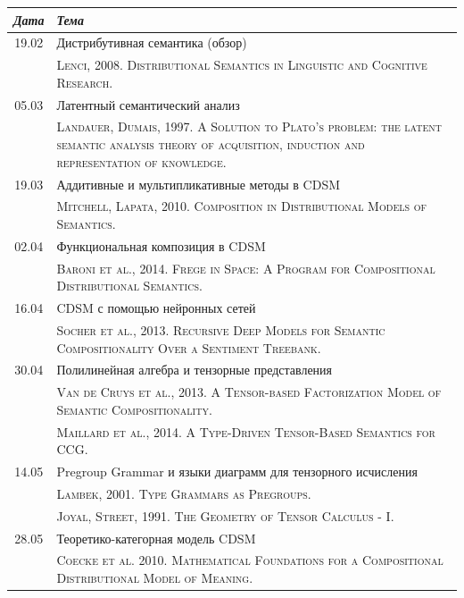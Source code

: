 \documentclass[12pt]{article}
\begin{document}
\begin{table}[h!]
\begin{tabularx}{\textwidth}{cX}
\textit{Дата}  & \textit{Тема} \bigstrut \\ \hline
19.02 & Дистрибутивная семантика (обзор) \bigstrut[t] \\
      & {\scriptsize \textsc{Lenci, 2008. Distributional Semantics in Linguistic and Cognitive Research.}}  \bigstrut[b] \\
05.03 & Латентный семантический анализ  \bigstrut[t] \\
      & {\scriptsize \textsc{Landauer, Dumais, 1997. A Solution to Plato's problem: the latent semantic analysis theory of acquisition, induction and representation of knowledge.}}  \bigstrut[b] \\
19.03 & Аддитивные и мультипликативные методы в CDSM \bigstrut[t] \\
      & {\scriptsize \textsc{Mitchell, Lapata, 2010. Composition in Distributional Models of Semantics.}} \bigstrut[b] \\
02.04 & Функциональная композиция в CDSM \bigstrut[t] \\
      & {\scriptsize \textsc{Baroni et al., 2014. Frege in Space: A Program for Compositional Distributional Semantics.}}                \bigstrut[b] \\
16.04 & CDSM с помощью нейронных сетей \bigstrut[t] \\
      & {\scriptsize \textsc{Socher et al., 2013. Recursive Deep Models for Semantic Compositionality Over a Sentiment Treebank.}} \bigstrut[b] \\
30.04 & Полилинейная алгебра и тензорные представления \bigstrut[t] \\
      & {\scriptsize \textsc{Van de Cruys et al., 2013. A Tensor-based Factorization Model of Semantic Compositionality.}}\\
      & {\scriptsize \textsc{Maillard et al., 2014. A Type-Driven Tensor-Based Semantics for CCG.}} \bigstrut[b] \\
14.05 & Pregroup Grammar и языки диаграмм для тензорного исчисления \bigstrut[t] \\
      & {\scriptsize \textsc{Lambek, 2001. Type Grammars as Pregroups.}}  \\
      & {\scriptsize \textsc{Joyal, Street, 1991. The Geometry of Tensor Calculus - I.}} \bigstrut[b] \\
28.05 & Теоретико-категорная модель CDSM \bigstrut[t] \\ 
      & {\scriptsize \textsc{Coecke et al. 2010. Mathematical Foundations for a Compositional Distributional Model of Meaning.}} \bigstrut[b] \\ 
\hline
\end{tabularx}
\end{table}
\end{document}
